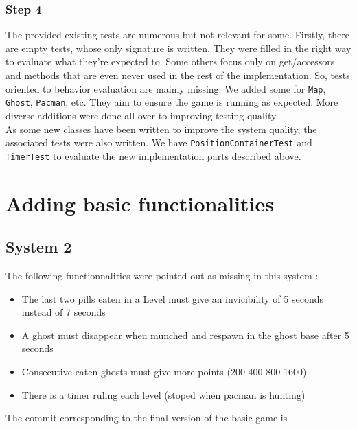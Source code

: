 \documentclass[]{article}
\begin{document}
\subsubsection{Step 4}

\indent \par The provided existing tests are numerous but not relevant for some. Firstly, there are empty tests, whose only signature is written. They were filled in the right way to evaluate what they're expected to. Some others focus only on get/accessors and methods that are even never used in the rest of the implementation. So, tests oriented to behavior evaluation are mainly missing. We added some for \texttt{Map}, \texttt{Ghost}, \texttt{Pacman}, etc. They aim to ensure the game is running as expected. More diverse additions were done all over to improving testing quality.\\

As some new classes have been written to improve the system quality, the associated tests were also written. We have \texttt{PositionContainerTest} and \texttt{TimerTest} to evaluate the new implementation parts described above.

\newpage
\section{Adding basic functionalities}

\subsection{System 2}

The following functionnalities were pointed out as missing in this system :

\begin{itemize}
\item The last two pills eaten in a Level must give an invicibility of 5 seconds instead of 7 seconds
\item A ghost must disappear when munched and respawn in the ghost base after 5 seconds
\item Consecutive eaten ghosts must give more points (200-400-800-1600)
\item There is a timer ruling each level (stoped when pacman is hunting)
\end{itemize}

\vspace{0.2cm}

The commit corresponding to the final version of the basic game is \\
\end{document}
